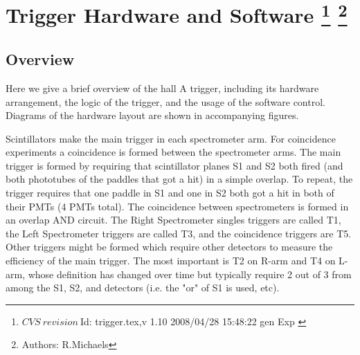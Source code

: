 \chapter[Trigger Hardware and Software]{Trigger Hardware and Software
\footnote{
  $CVS~revision~ $Id: trigger.tex,v 1.10 2008/04/28 15:48:22 gen Exp $ $
}
\footnote{Authors: R.Michaels }
}

\section{Overview}
\par
Here we give a brief overview of the 
hall A trigger, including its hardware arrangement,
the logic of the trigger, and the usage
of the software control.
Diagrams of the hardware layout are shown in
accompanying figures.

\par

Scintillators make the main trigger 
in each spectrometer arm. For coincidence experiments a 
coincidence is formed between the spectrometer arms.   
The main trigger is formed by requiring that scintillator 
planes S1 and S2 both fired (and both phototubes of the 
paddles that got a hit) in a simple overlap. To repeat, 
the trigger requires that one paddle in S1 and one in 
S2 both got a hit in both of their PMTs (4 PMTs total).  
The coincidence between spectrometers is formed in an 
overlap AND circuit.  The Right Spectrometer singles 
triggers are called T1, the Left Spectrometer triggers 
are called T3, and the coincidence triggers are T5.   
Other triggers might be formed which require other detectors 
to measure the efficiency of the main trigger. The most 
important is T2 on R-arm and T4 on L-arm, whose definition 
has changed over time but typically require 2 out of 3 
from among the S1, S2, and \Cherenkov{} detectors (i.e. the 
"or" of S1 is used, etc).



